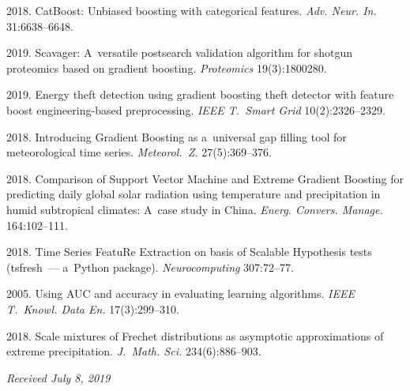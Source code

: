 \begin{multicols}{2}
{{\begin{thebibliography}{99}
 2018. CatBoost: Unbiased boosting with categorical features. 
 \textit{Adv. Neur. In.} 31:6638--6648.

 2019. Scavager: A~versatile postsearch validation algorithm for shotgun 
 proteomics based on gradient boosting. \textit{Proteomics} 19(3):1800280.

 2019. 
Energy theft detection using gradient boosting theft detector with feature 
boost engineering-based preprocessing. 
\textit{IEEE T.~Smart Grid} 10(2):2326--2329.

 2018. Introducing Gradient Boosting as a~universal gap filling tool 
 for meteorological time series. \textit{Meteorol.~Z.} 27(5):369--376.

 2018. Comparison of Support Vector Machine and Extreme Gradient Boosting
  for predicting daily global solar radiation using temperature and 
  precipitation in humid subtropical climates: A~case study in China. 
\textit{Energ. Convers.  Manage.} 164:102--111.

 2018. Time Series FeatuRe Extraction on basis of Scalable Hypothesis 
 tests (tsfresh~--- a~Python package). \textit{Neurocomputing} 307:72--77.
  
 2005. 
Using AUC and accuracy in evaluating learning algorithms. 
\textit{IEEE T.~Knowl. Data En.} 17(3):299--310.

 2018. Scale mixtures of Frechet distributions as asymptotic approximations 
 of extreme precipitation. \textit{J.~Math. Sci.} 234(6):886--903.
\end{thebibliography}

 }
 }

\end{multicols}


\hfill{\small\textit{Received July 8, 2019}}




